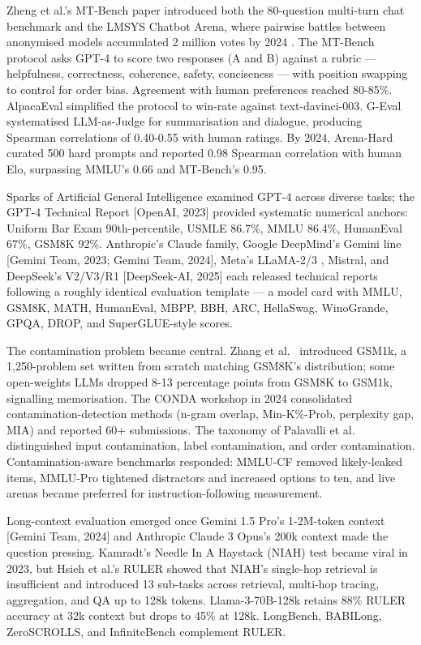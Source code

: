 \documentclass{article}
\begin{document}
Zheng et al.'s MT-Bench paper \cite{zheng20232023} introduced both the 80-question multi-turn chat benchmark and the LMSYS Chatbot Arena, where pairwise battles between anonymised models accumulated 2 million votes by 2024 \cite{chiang20242024}. The MT-Bench protocol asks GPT-4 to score two responses (A and B) against a rubric --- helpfulness, correctness, coherence, safety, conciseness --- with position swapping to control for order bias. Agreement with human preferences reached 80-85\%. AlpacaEval \cite{dubois20242024} simplified the protocol to win-rate against text-davinci-003. G-Eval \cite{liu2023gevalnlgevaluation} systematised LLM-as-Judge for summarisation and dialogue, producing Spearman correlations of 0.40-0.55 with human ratings. By 2024, Arena-Hard \cite{li20242024} curated 500 hard prompts and reported 0.98 Spearman correlation with human Elo, surpassing MMLU's 0.66 and MT-Bench's 0.95.

Sparks of Artificial General Intelligence \cite{bubeck20232023} examined GPT-4 across diverse tasks; the GPT-4 Technical Report {[}OpenAI, 2023{]} provided systematic numerical anchors: Uniform Bar Exam 90th-percentile, USMLE 86.7\%, MMLU 86.4\%, HumanEval 67\%, GSM8K 92\%. Anthropic's Claude family, Google DeepMind's Gemini line {[}Gemini Team, 2023; Gemini Team, 2024{]}, Meta's LLaMA-2/3 \cite{touvron20232023}, Mistral, and DeepSeek's V2/V3/R1 {[}DeepSeek-AI, 2025{]} each released technical reports following a roughly identical evaluation template --- a model card with MMLU, GSM8K, MATH, HumanEval, MBPP, BBH, ARC, HellaSwag, WinoGrande, GPQA, DROP, and SuperGLUE-style scores.

The contamination problem became central. Zhang et al.~\cite{zhang20242024} introduced GSM1k, a 1,250-problem set written from scratch matching GSM8K's distribution; some open-weights LLMs dropped 8-13 percentage points from GSM8K to GSM1k, signalling memorisation. The CONDA workshop in 2024 \cite{sainz20242024} consolidated contamination-detection methods (n-gram overlap, Min-K\%-Prob, perplexity gap, MIA) and reported 60+ submissions. The taxonomy of Palavalli et al.~\cite{palavalli2024ataxonomyfordataco} distinguished input contamination, label contamination, and order contamination. Contamination-aware benchmarks responded: MMLU-CF \cite{zhao20242024} removed likely-leaked items, MMLU-Pro \cite{wang20242024} tightened distractors and increased options to ten, and live arenas became preferred for instruction-following measurement.

Long-context evaluation emerged once Gemini 1.5 Pro's 1-2M-token context {[}Gemini Team, 2024{]} and Anthropic Claude 3 Opus's 200k context made the question pressing. Kamradt's Needle In A Haystack (NIAH) test \cite{kamradt2023needleinahaystackp} became viral in 2023, but Hsieh et al.'s RULER \cite{hsieh20242024} showed that NIAH's single-hop retrieval is insufficient and introduced 13 sub-tasks across retrieval, multi-hop tracing, aggregation, and QA up to 128k tokens. Llama-3-70B-128k retains 88\% RULER accuracy at 32k context but drops to 45\% at 128k. LongBench, BABILong, ZeroSCROLLS, and InfiniteBench complement RULER.
\end{document}
